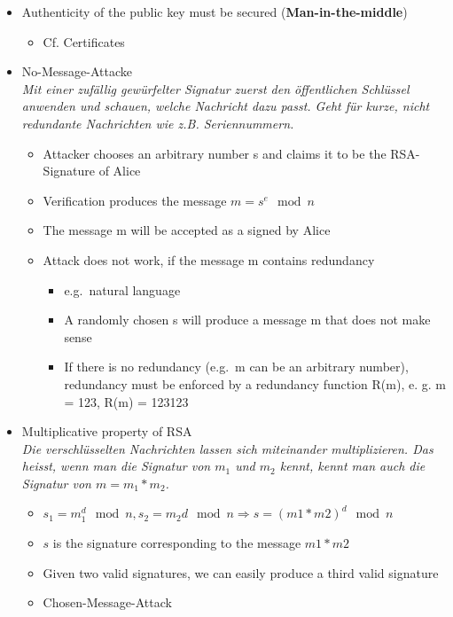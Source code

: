 \begin{itemize}
\tightlist
\item
  Authenticity of the public key must be secured
  (\textbf{Man-in-the-middle})

  \begin{itemize}
  \tightlist
  \item
    Cf. Certificates
  \end{itemize}
\item
  No-Message-Attacke\\
  \emph{Mit einer zufällig gewürfelter Signatur zuerst den öffentlichen
  Schlüssel anwenden und schauen, welche Nachricht dazu passt. Geht für
  kurze, nicht redundante Nachrichten wie z.B. Seriennummern.}

  \begin{itemize}
  \tightlist
  \item
    Attacker chooses an arbitrary number s and claims it to be the
    RSA-Signature of Alice
  \item
    Verification produces the message $m = s^e \mod n$
  \item
    The message m will be accepted as a signed by Alice
  \item
    Attack does not work, if the message m contains redundancy

    \begin{itemize}
    \tightlist
    \item
      e.g.~natural language
    \item
      A randomly chosen s will produce a message m that does not make
      sense
    \item
      If there is no redundancy (e.g.~m can be an arbitrary number),
      redundancy must be enforced by a redundancy function R(m), e. g. m
      = 123, R(m) = 123123
    \end{itemize}
  \end{itemize}
\item
  Multiplicative property of RSA\\
  \emph{Die verschlüsselten Nachrichten lassen sich miteinander
  multiplizieren. Das heisst, wenn man die Signatur von $m_1$ und $m_2$ kennt,
  kennt man auch die Signatur von $m = m_1 * m_2$.}

  \begin{itemize}
  \tightlist
  \item
    $s_1 = m_1^d \mod n, s_2 = m_2d \mod n \Rightarrow s = (m1 * m2 )^d \mod n$
  \item
    $s$ is the signature corresponding to the message $m1 * m2$
  \item
    Given two valid signatures, we can easily produce a third valid
    signature
  \item
    Chosen-Message-Attack


\end{itemize}
\end{itemize}
